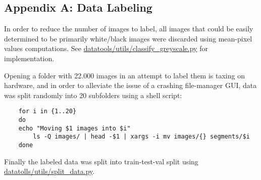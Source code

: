 \subsection*{Appendix A: Data Labeling}\label{appendix: A}
In order to reduce the number of images to label, all images that could be easily determined to be primarily white/black images were discarded using mean-pixel values computations. 
See \url{datatools/utils/classify_greyscale.py} for implementation. 

Opening a folder with 22.000 images in an attempt to label them is taxing on hardware, and in order to alleviate the issue of a crashing file-manager GUI, data was split randomly into 20 subfolders using a shell script:
\begin{verbatim}
    for i in {1..20}
    do
	echo "Moving $1 images into $i"
        ls -Q images/ | head -$1 | xargs -i mv images/{} segments/$i
    done
\end{verbatim}

Finally the labeled data was split into train-test-val split using \url{datatolls/utils/split_data.py}.

